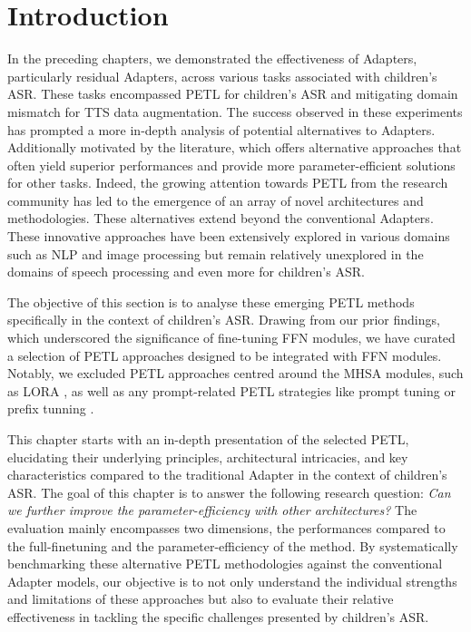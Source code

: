 \label{chap:7}
\cleardoublepage
\section{Introduction}
In the preceding chapters, we demonstrated the effectiveness of Adapters, particularly residual Adapters, across various tasks associated with children's \ac{ASR}. These tasks encompassed \ac{PETL} for children's \ac{ASR} and mitigating domain mismatch for \ac{TTS} data augmentation. The success observed in these experiments has prompted a more in-depth analysis of potential alternatives to Adapters. Additionally motivated by the literature, which offers alternative approaches that often yield superior performances and provide more parameter-efficient solutions for other tasks.
Indeed, the growing attention towards \ac{PETL} from the research community has led to the emergence of an array of novel architectures and methodologies. These alternatives extend beyond the conventional Adapters. These innovative approaches have been extensively explored in various domains such as \ac{NLP} and image processing but remain relatively unexplored in the domains of speech processing and even more for children's \ac{ASR}.

The objective of this section is to analyse these emerging \ac{PETL} methods specifically in the context of children's \ac{ASR}. Drawing from our prior findings, which underscored the significance of fine-tuning \ac{FFN} modules, we have curated a selection of \ac{PETL} approaches designed to be integrated with \ac{FFN} modules. Notably, we excluded \ac{PETL} approaches centred around the \ac{MHSA} modules, such as LORA \cite{hu2022lora}, as well as any prompt-related \ac{PETL} strategies like prompt tuning \cite{lester-etal-2021-power} or prefix tunning \cite{li-liang-2021-prefix}.

This chapter starts with an in-depth presentation of the selected \ac{PETL},  elucidating their underlying principles, architectural intricacies, and key characteristics compared to the traditional Adapter in the context of children's \ac{ASR}. The goal of this chapter is to answer the following research question: \textit{Can we further improve the parameter-efficiency with other architectures?} The evaluation mainly encompasses two dimensions, the performances compared to the full-finetuning and the parameter-efficiency of the method. By systematically benchmarking these alternative \ac{PETL} methodologies against the conventional Adapter models, our objective is to not only understand the individual strengths and limitations of these approaches but also to evaluate their relative effectiveness in tackling the specific challenges presented by children's \ac{ASR}.

